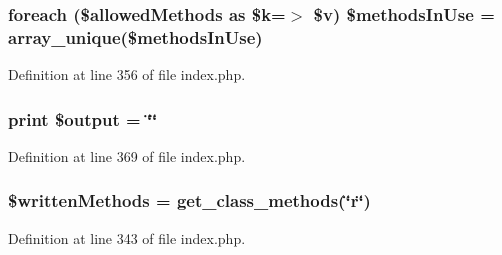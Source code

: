 \hypertarget{index_8php_a1c475c0c53206fb15c4c3028bb7d5c7c}{
\subsubsection[{\$methods\-In\-Use}]{\setlength{\rightskip}{0pt plus 5cm}foreach (\$allowed\-Methods as \$k=$>$ \$v) \$methods\-In\-Use = array\-\_\-unique(\$methods\-In\-Use)}}\label{index_8php_a1c475c0c53206fb15c4c3028bb7d5c7c}


Definition at line 356 of file index.\-php.

\hypertarget{index_8php_a3b3e916294d02621688f0b1b64f95628}{
\subsubsection[{\$output}]{\setlength{\rightskip}{0pt plus 5cm}print \$output = \char`\"{}\char`\"{}}}\label{index_8php_a3b3e916294d02621688f0b1b64f95628}


Definition at line 369 of file index.\-php.

\hypertarget{index_8php_a2e64f0494f7eccf90168af7f67198650}{
\subsubsection[{\$written\-Methods}]{\setlength{\rightskip}{0pt plus 5cm}\$written\-Methods = get\-\_\-class\-\_\-methods(\char`\"{}r\char`\"{})}}\label{index_8php_a2e64f0494f7eccf90168af7f67198650}


Definition at line 343 of file index.\-php.

